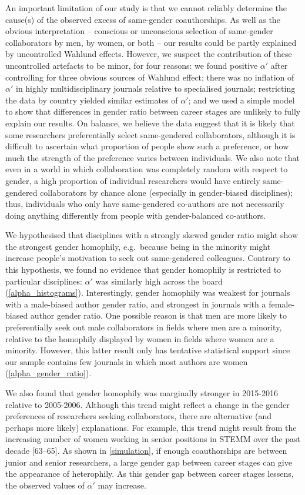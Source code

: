 \documentclass[12pt,]{article}
\begin{document}
An important limitation of our study is that we cannot reliably
determine the cause(s) of the observed excess of same-gender
coauthorships. As well as the obvious interpretation -- conscious or
unconscious selection of same-gender collaborators by men, by women, or
both -- our results could be partly explained by uncontrolled Wahlund
effects. However, we suspect the contribution of these uncontrolled
artefacts to be minor, for four reasons: we found positive \(\alpha'\)
after controlling for three obvious sources of Wahlund effect; there was
no inflation of \(\alpha'\) in highly multidisciplinary journals
relative to specialised journals; restricting the data by country
yielded similar estimates of \(\alpha'\); and we used a simple model to
show that differences in gender ratio between career stages are unlikely
to fully explain our results. On balance, we believe the data suggest
that it is likely that some researchers preferentially select
same-gendered collaborators, although it is difficult to ascertain what
proportion of people show such a preference, or how much the strength of
the preference varies between individuals. We also note that even in a
world in which collaboration was completely random with respect to
gender, a high proportion of individual researchers would have entirely
same-gendered collaborators by chance alone (especially in gender-biased
disciplines); thus, individuals who only have same-gendered co-authors
are not necessarily doing anything differently from people with
gender-balanced co-authors.

We hypothesised that disciplines with a strongly skewed gender ratio
might show the strongest gender homophily, e.g.~because being in the
minority might increase people's motivation to seek out same-gendered
colleagues. Contrary to this hypothesis, we found no evidence that
gender homophily is restricted to particular disciplines: \(\alpha'\)
was similarly high across the board (\autoref{alpha_histograms}).
Interestingly, gender homophily was weakest for journals with a
male-biased author gender ratio, and strongest in journals with a
female-biased author gender ratio. One possible reason is that men are
more likely to preferentially seek out male collaborators in fields
where men are a minority, relative to the homophily displayed by women
in fields where women are a minority. However, this latter result only
has tentative statistical support since our sample contains few journals
in which most authors are women (\autoref{alpha_gender_ratio}).

We also found that gender homophily was marginally stronger in 2015-2016
relative to 2005-2006. Although this trend might reflect a change in the
gender preferences of researchers seeking collaborators, there are
alternative (and perhaps more likely) explanations. For example, this
trend might result from the increasing number of women working in senior
positions in STEMM over the past decade {[}63--65{]}. As shown in
\autoref{simulation}, if enough coauthorships are between junior and
senior researchers, a large gender gap between career stages can give
the appearance of heterophily. As this gender gap between career stages
lessens, the observed values of \(\alpha'\) may increase.
\end{document}
